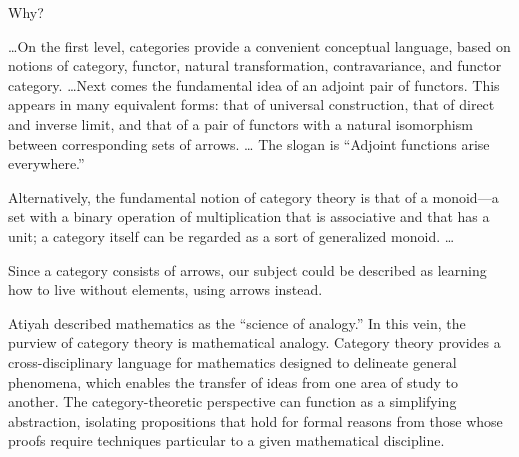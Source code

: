 \begin{plSection}{Why?}
\begin{plQuote}
{}
{}
\ldots On the first level, categories provide
a convenient conceptual language, based on notions of category, 
functor, natural transformation, contravariance, and
functor category.
\ldots Next comes the fundamental idea of an adjoint pair of functors.
This appears in many equivalent forms: that of universal construction,
that of direct and inverse limit, 
and that of a pair of functors with a natural isomorphism between
corresponding sets of arrows. \ldots
The slogan is ``Adjoint functions arise everywhere.''
\par
Alternatively, the fundamental notion of category theory is that
of a monoid---a set with a binary operation of multiplication
that is associative and that has a unit;
a category itself can be regarded as a sort of generalized monoid.
\ldots
\par
Since a category consists of arrows, our subject could be 
described as learning how to live without elements, using arrows
instead.
\end{plQuote}

\begin{plQuote}
{}
{}
Atiyah described mathematics as the
``science of analogy.'' In this vein, the purview
of category theory is mathematical analogy. 
Category theory provides a cross-disciplinary
language for mathematics designed to delineate general phenomena,
which enables the
transfer of ideas from one area of study to another. 
The category-theoretic perspective can
function as a simplifying abstraction, isolating propositions 
that hold for formal reasons
from those whose proofs require techniques particular 
to a given mathematical discipline.
\end{plQuote}


\end{plSection}
